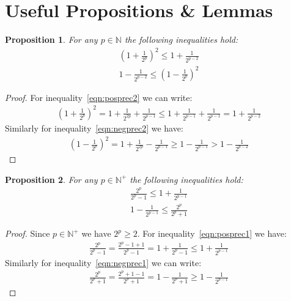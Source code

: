 \documentclass{article}
\newcommand{\nat}{\mathbb{N}}
\numberwithin{mytheorem}{section}
\newtheorem{proposition}{Proposition}
\begin{document}


\appendix

\section{Useful Propositions \& Lemmas}\label{app:prop_lem}
\begin{proposition}\label{prop:prec2}
For any $p\in \nat$ the following inequalities hold:
\begin{align}
(1+\frac{1}{2^{p}})^2\leq 1+\frac{1}{2^{p-2}} \label{eqn:posprec2}\\
1-\frac{1}{2^{p-2}}\leq (1-\frac{1}{2^{p}})^2 \label{eqn:negprec2}
\end{align}
\end{proposition}
\begin{proof}
For inequality~\eqref{eqn:posprec2} we can write:
\begin{align*}
(1+\frac{1}{2^{p}})^2=1+\frac{1}{2^{2p}}+\frac{1}{2^{p-1}}\leq 1+\frac{1}{2^{p-1}}+\frac{1}{2^{p-1}}=1+\frac{1}{2^{p-2}}
\end{align*}
Similarly for inequality~\eqref{eqn:negprec2} we have:
\begin{align*}
(1-\frac{1}{2^{p}})^2=1+\frac{1}{2^{2p}}-\frac{1}{2^{p-1}}\geq 1-\frac{1}{2^{p-1}}>1-\frac{1}{2^{p-2}}
\end{align*}

\end{proof}

\begin{proposition}\label{prop:prec1}
For any $p\in \nat^{+}$ the following inequalities hold:
\begin{align}
\frac{2^{p}}{2^{p}-1}\leq 1+\frac{1}{2^{p-1}}\label{eqn:posprec1}\\
1-\frac{1}{2^{p-1}}\leq \frac{2^{p}}{2^{p}+1}\label{eqn:negprec1}
\end{align}
\end{proposition}

\begin{proof}
Since $p\in \nat^+$ we have $2^p\geq 2$. For inequality~\eqref{eqn:posprec1} we have:
\begin{align*}
\frac{2^{p}}{2^{p}-1}=\frac{2^{p}-1+1}{2^{p}-1}=1+\frac{1}{2^{p}-1}\leq 1+\frac{1}{2^{p-1}}
\end{align*}
Similarly for inequality~\eqref{eqn:negprec1} we can write:
\begin{align*}
\frac{2^{p}}{2^{p}+1}=\frac{2^{p}+1-1}{2^{p}+1}=1-\frac{1}{2^{p}+1}\geq 1-\frac{1}{2^{p-1}}
\end{align*}

\end{proof}
\end{document}
